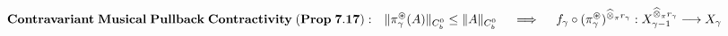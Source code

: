 \documentclass[preview]{standalone}
\begin{document}
\begin{align*}
\special{dvisvgm:raw <g id='unique000'>}\mathbf{Contravariant\;Musical\;Pullback\;Contractivity\;(Prop\;7.17):}\quad \|\pi_\gamma^\circledast(A)\|_{C_b^0} \le \|A\|_{C_b^0} \quad\implies\quad f_\gamma\circ(\pi_\gamma^\circledast)^{\widehat{\otimes}_\pi r_\gamma} : X_{\gamma-1}^{\widehat{\otimes}_\pi r_\gamma} \longrightarrow X_\gamma\special{dvisvgm:raw </g>}
\end{align*}
\end{document}
